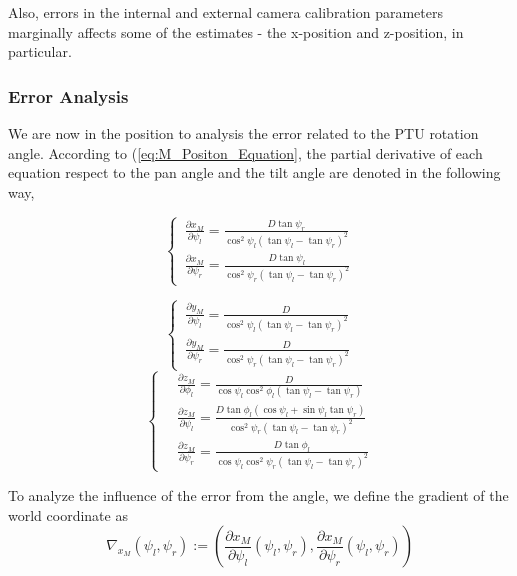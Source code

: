 Also, errors in the internal and external camera calibration parameters marginally affects some of the estimates - the x-position and z-position, in particular.

\subsubsection{Error Analysis}
We are now in the position to analysis the error related to the PTU rotation angle. According to (\ref{eq:M_Positon_Equation}, the partial derivative of each equation respect to the pan angle and the tilt angle are denoted in the following way,

\begin{equation}
	\left\{ \,
	\begin{aligned}
		\frac{ \partial x_M}{ \partial \psi_l} = \frac{D \tan \psi_r}{ \cos^2 \psi_l (\tan \psi_l - \tan \psi_r)^2} \\
		\frac{ \partial x_M}{\partial \psi_r} = \frac{D \tan \psi_l}{\cos^2 \psi_r (\tan \psi_l - \tan \psi_r)^2} 
	\end{aligned}
	\right.
\end{equation}

\begin{equation}
	\left\{ \,
	\begin{aligned}
		\frac{\partial y_M}{\partial \psi_l} = \frac{ D}{\cos^2 \psi_l (\tan \psi_l - \tan \psi_r)^2} \\
		\frac{\partial y_M}{\partial \psi_r} = \frac{D}{\cos^2 \psi_r (\tan \psi_l - \tan \psi_r)^2} 
	\end{aligned}
	\right.	
\end{equation}
\begin{equation}
	\left\{ \,
	\begin{aligned}
		&\frac{ \partial z_M}{ \partial \phi_l} = \frac{D}{ \cos \psi_l \cos^2 \phi_l (\tan \psi_l - \tan \psi_r)} \\
		&\frac{\partial z_M}{\partial \psi_l} = \frac{ D \tan \phi_l(\cos \psi_l + \sin \psi_l \tan \psi_r)}{ \cos^2 \psi_r (\tan \psi_l - \tan \psi_r)^2} \\
		&\frac{ \partial z_M}{ \partial \psi_r} = \frac{ D \tan \phi_l}{ \cos \psi_l \cos^2 \psi_r (\tan \psi_l - \tan \psi_r)^2}
	\end{aligned}
	\right.
\end{equation} 

To analyze the influence of the error from the angle, we define the gradient of the world coordinate as
\begin{equation}
	\nabla_{x_M}(\psi_l, \psi_r):=\left( \frac{\partial x_M}{\partial \psi_l}(\psi_l, \psi_r), \frac{\partial x_M}{\partial \psi_r}(\psi_l, \psi_r)  \right)
\end{equation}

